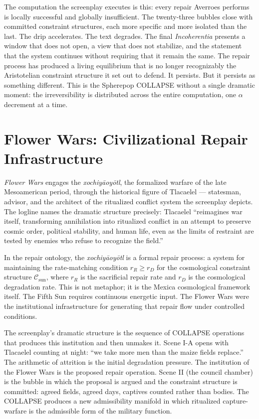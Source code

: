 \documentclass[11pt, a4paper]{article}
\theoremstyle{definition}
\theoremstyle{remark}
\begin{document}
The computation the screenplay executes is this: every repair Averroes performs
is locally successful and globally insufficient. The twenty-three bubbles close
with committed constraint structures, each more specific and more isolated than
the last. The drip accelerates. The text degrades. The final \textit{Incoherentia}
presents a window that does not open, a view that does not stabilize, and the
statement that the system continues without requiring that it remain the same.
The repair process has produced a living equilibrium that is no longer
recognizably the Aristotelian constraint structure it set out to defend. It
persists. But it persists as something different. This is the Spherepop COLLAPSE
without a single dramatic moment: the irreversibility is distributed across the
entire computation, one $\alpha$ decrement at a time.

\section{Flower Wars: Civilizational Repair Infrastructure}

\textit{Flower Wars} engages the \textit{xochiy\={a}oy\={o}tl}, the formalized
warfare of the late Mesoamerican period, through the historical figure of
Tlacaelel --- statesman, advisor, and the architect of the ritualized conflict
system the screenplay depicts. The logline names the dramatic structure
precisely: Tlacaelel ``reimagines war itself, transforming annihilation into
ritualized conflict in an attempt to preserve cosmic order, political stability,
and human life, even as the limits of restraint are tested by enemies who
refuse to recognize the field.''

In the repair ontology, the \textit{xochiy\={a}oy\={o}tl} is a formal repair
process: a system for maintaining the rate-matching condition $r_R \geq r_D$
for the cosmological constraint structure $\mathcal{C}_{\text{sun}}$, where
$r_R$ is the sacrificial repair rate and $r_D$ is the cosmological degradation
rate. This is not metaphor; it is the Mexica cosmological framework itself.
The Fifth Sun requires continuous energetic input. The Flower Wars were the
institutional infrastructure for generating that repair flow under controlled
conditions.

The screenplay's dramatic structure is the sequence of COLLAPSE operations
that produces this institution and then unmakes it. Scene I-A opens with
Tlacaelel counting at night: ``we take more men than the maize fields replace.''
The arithmetic of attrition is the initial degradation pressure. The institution
of the Flower Wars is the proposed repair operation. Scene II (the council
chamber) is the bubble in which the proposal is argued and the constraint
structure is committed: agreed fields, agreed days, captives counted rather
than bodies. The COLLAPSE produces a new admissibility manifold in which
ritualized capture-warfare is the admissible form of the military function.
\end{document}
